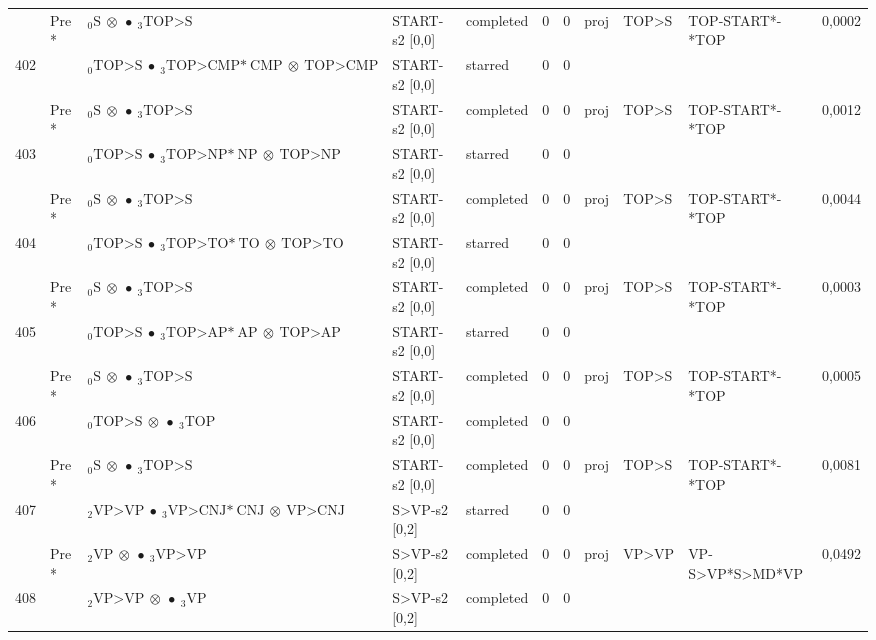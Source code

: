 \documentclass[10pt]{article}
\begin{document}
\begin{longtable}[htbp]{lllllllllll}
 & Pre *& $ {}_0 \textrm{S} \  \otimes \  \bullet \ {}_{3} \textrm{TOP>S} $ & START-s2 [0,0] & completed & 0 & 0 & proj & TOP>S & TOP-START*-*TOP & 0,0002 \\ 
402 & & $ {}_0 \textrm{TOP>S} \  \bullet \ {}_{3} \textrm{TOP>CMP*} \ \textrm{CMP} \  \otimes \ \textrm{TOP>CMP} $ & START-s2 [0,0] & starred & 0 & 0 & & & & \\ 
 & Pre *& $ {}_0 \textrm{S} \  \otimes \  \bullet \ {}_{3} \textrm{TOP>S} $ & START-s2 [0,0] & completed & 0 & 0 & proj & TOP>S & TOP-START*-*TOP & 0,0012 \\ 
403 & & $ {}_0 \textrm{TOP>S} \  \bullet \ {}_{3} \textrm{TOP>NP*} \ \textrm{NP} \  \otimes \ \textrm{TOP>NP} $ & START-s2 [0,0] & starred & 0 & 0 & & & & \\ 
 & Pre *& $ {}_0 \textrm{S} \  \otimes \  \bullet \ {}_{3} \textrm{TOP>S} $ & START-s2 [0,0] & completed & 0 & 0 & proj & TOP>S & TOP-START*-*TOP & 0,0044 \\ 
404 & & $ {}_0 \textrm{TOP>S} \  \bullet \ {}_{3} \textrm{TOP>TO*} \ \textrm{TO} \  \otimes \ \textrm{TOP>TO} $ & START-s2 [0,0] & starred & 0 & 0 & & & & \\ 
 & Pre *& $ {}_0 \textrm{S} \  \otimes \  \bullet \ {}_{3} \textrm{TOP>S} $ & START-s2 [0,0] & completed & 0 & 0 & proj & TOP>S & TOP-START*-*TOP & 0,0003 \\ 
405 & & $ {}_0 \textrm{TOP>S} \  \bullet \ {}_{3} \textrm{TOP>AP*} \ \textrm{AP} \  \otimes \ \textrm{TOP>AP} $ & START-s2 [0,0] & starred & 0 & 0 & & & & \\ 
 & Pre *& $ {}_0 \textrm{S} \  \otimes \  \bullet \ {}_{3} \textrm{TOP>S} $ & START-s2 [0,0] & completed & 0 & 0 & proj & TOP>S & TOP-START*-*TOP & 0,0005 \\ 
406 & & $ {}_0 \textrm{TOP>S} \  \otimes \  \bullet \ {}_{3} \textrm{TOP} $ & START-s2 [0,0] & completed & 0 & 0 & & & & \\ 
 & Pre *& $ {}_0 \textrm{S} \  \otimes \  \bullet \ {}_{3} \textrm{TOP>S} $ & START-s2 [0,0] & completed & 0 & 0 & proj & TOP>S & TOP-START*-*TOP & 0,0081 \\ 
407 & & $ {}_2 \textrm{VP>VP} \  \bullet \ {}_{3} \textrm{VP>CNJ*} \ \textrm{CNJ} \  \otimes \ \textrm{VP>CNJ} $ & S>VP-s2 [0,2] & starred & 0 & 0 & & & & \\ 
 & Pre *& $ {}_2 \textrm{VP} \  \otimes \  \bullet \ {}_{3} \textrm{VP>VP} $ & S>VP-s2 [0,2] & completed & 0 & 0 & proj & VP>VP & VP-S>VP*S>MD*VP & 0,0492 \\ 
408 & & $ {}_2 \textrm{VP>VP} \  \otimes \  \bullet \ {}_{3} \textrm{VP} $ & S>VP-s2 [0,2] & completed & 0 & 0 & & & & \\ 

\end{longtable}
\end{document}
